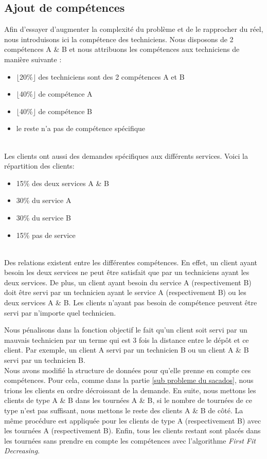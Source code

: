 \subsection{Ajout de compétences}
\label{S ajout de competences}
Afin d'essayer d'augmenter la complexité du problème et de le rapprocher du réel, nous introduisons ici la compétence des techniciens. Nous disposons de 2 compétences A \& B et nous attribuons les compétences aux techniciens de manière suivante :
\begin{itemize}
    \item $\lfloor$20\%$\rfloor$ des techniciens sont des 2 compétences A et B
    \item $\lfloor$40\%$\rfloor$ de compétence A
    \item $\lfloor$40\%$\rfloor$ de compétence B
    \item le reste n'a pas de compétence spécifique
\end{itemize}
\\

Les clients ont aussi des demandes spécifiques aux différents services. Voici la répartition des clients:
\begin{itemize}
    \item 15\% des deux services A \& B
    \item 30\% du service A
    \item 30\% du service B
    \item 15\% pas de service
\end{itemize}
\\

Des relations existent entre les différentes compétences. En effet, un client ayant besoin les deux services ne peut être satisfait que par un techniciens ayant les deux services. De plus, un client ayant besoin du service A (respectivement B) doit être servi par un technicien ayant le service A (respectivement B) ou les deux services A \& B. Les clients n'ayant pas besoin de compétence peuvent être servi par n'importe quel technicien.

Nous pénalisons dans la fonction objectif le fait qu'un client soit servi par un mauvais technicien par un terme qui est 3 fois la distance entre le dépôt et ce client. Par exemple, un client A servi par un technicien B ou un client A \& B servi par un technicien B.\\


Nous avons modifié la structure de données pour qu'elle prenne en compte ces compétences. Pour cela, comme dans la partie \ref{sub probleme du sacados}, nous trions les clients en ordre décroissant de la demande. En suite, nous mettons les clients de type A \& B dans les tournées A \& B, si le nombre de tournées de ce type n'est pas suffisant, nous mettons le reste des clients A \& B de côté. La même procédure est appliquée pour les clients de type A (respectivement B) avec les tournées A (respectivement B). Enfin, tous les clients restant sont placés dans les tournées sans prendre en compte les compétences avec l'algorithme \textit{First Fit Decreasing}.

